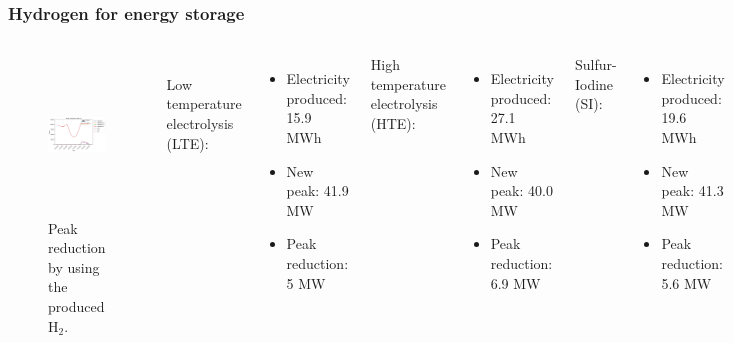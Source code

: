 \begin{frame}
\frametitle{Hydrogen for energy storage}
\begin{columns}
    \column[t]{6.8cm}
	\begin{figure}[htbp!]
		\begin{center}
			\includegraphics[height=4.2cm]{images/uiuc-hydro3B}
		\end{center}
		\caption{Peak reduction by using the produced H$_2$.}
	\end{figure}

    \column[t]{5.2cm}
    \\
    Low temperature electrolysis (LTE):
    \begin{itemize}
 		\item Electricity produced: 15.9 MWh
 		\item New peak: 41.9 MW
 		\item Peak reduction: 5 MW
 	\end{itemize}

    High temperature electrolysis (HTE):
    \begin{itemize}
		\item Electricity produced: 27.1 MWh
		\item New peak: 40.0 MW
        \item Peak reduction: 6.9 MW
 	\end{itemize}

    Sulfur-Iodine (SI):
    \begin{itemize}
		\item Electricity produced: 19.6 MWh
		\item New peak: 41.3 MW
        \item Peak reduction: 5.6 MW
 	\end{itemize}

\end{columns}
\end{frame}